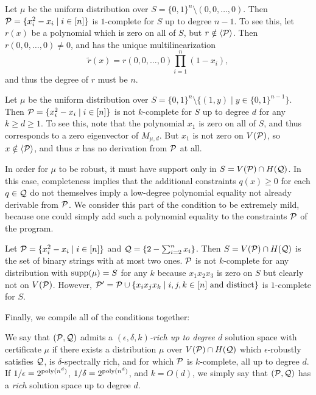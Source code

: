 \begin{example}
Let $\mu$ be the uniform distribution over $S = \{0,1\}^n \setminus (0,0,\dots,0)$. Then $\mathcal P = \{x_i^2 - x_i \mid i \in [n]\}$ is $1$-complete for $S$ up to degree $n-1$. To see this, let $r(x)$ be a polynomial which is zero on all of $S$, but $r \notin \langle \mathcal P \rangle$. Then $r(0,0,\dots,0) \neq 0$, and has the unique multilinearization 
\[\tilde{r}(x) = r(0,0,\dots,0)\prod_{i=1}^n \left(1-x_i\right),\]
and thus the degree of $r$ must be $n$.
\end{example}
\begin{example}\label{ex:not-complete}
Let $\mu$ be the uniform distribution over $S = \{0,1\}^n \setminus \{(1,y) \mid y \in \{0,1\}^{n-1}\}$. Then $\mathcal P = \{x_i^2 - x_i \mid i \in [n]\}$ is not $k$-complete for $S$ up to degree $d$ for any $k \geq d \geq 1$. To see this, note that the polynomial $x_1$ is zero on all of $S$, and thus corresponds to a zero eigenvector of $M_{\mu,d}$. But $x_1$ is not zero on $V(\mathcal P)$, so $x \notin \langle \mathcal P \rangle$, and thus $x$ has no derivation from $\mathcal P$ at all. 
\end{example}
In order for $\mu$ to be robust, it must have support only in $S = V(\mathcal P) \cap H(\mathcal Q)$. In this case, completeness implies that the additional constraints $q(x) \geq 0$ for each $q \in \mathcal Q$ do not themselves imply a low-degree polynomial equality not already derivable from $\mathcal P$. We consider this part of the condition to be extremely mild, because one could simply add such a polynomial equality to the constraints $\mathcal P$ of the program. 
\begin{example}
Let $\mathcal P = \{x_i^2 - x_i \mid i \in [n]\}$ and $\mathcal Q = \{2 - \sum_{i=2}^n x_i\}$. Then $S = V(\mathcal P) \cap H(\mathcal Q)$ is the set of binary strings with at most two ones. $\mathcal P$ is not $k$-complete for any distribution with $\operatorname{supp}(\mu) = S$ for any $k$ because $x_1x_2x_3$ is zero on $S$ but clearly not on $V(\mathcal P)$. However, $\mathcal P' = \mathcal P \cup \{x_ix_jx_k \mid i,j,k \in [n] \text{ and distinct}\}$ is $1$-complete for $S$.
\end{example}

Finally, we compile all of the conditions together:
\begin{definition}
We say that $(\mathcal P, \mathcal Q)$ admits a \emph{$(\epsilon,\delta,k)$-rich up to degree $d$} solution space with certificate $\mu$ if there exists a distribution $\mu$ over $V(\mathcal P) \cap H(\mathcal Q)$ which $\epsilon$-robustly satisfies $\mathcal Q$, is $\delta$-spectrally rich, and for which $\mathcal P$ is $k$-complete, all up to degree $d$. If $1/\epsilon = 2^{\operatorname{poly}(n^d)}$, $1/\delta = 2^{\operatorname{poly}(n^d)}$, and $k = O(d)$, we simply say that $(\mathcal P, \mathcal Q)$ has a \emph{rich} solution space up to degree $d$.
\end{definition}

